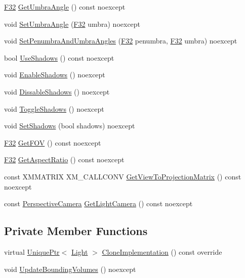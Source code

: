 \begin{DoxyCompactItemize}
\item 
\hyperlink{namespacemage_aa97e833b45f06d60a0a9c4fc22ae02c0}{F32} \hyperlink{classmage_1_1_spot_light_ae29059615f77f1afe414dc826b2d2af8}{Get\+Umbra\+Angle} () const noexcept
\item 
void \hyperlink{classmage_1_1_spot_light_aab2685ef31177d7e40ef964fb9bc0e24}{Set\+Umbra\+Angle} (\hyperlink{namespacemage_aa97e833b45f06d60a0a9c4fc22ae02c0}{F32} umbra) noexcept
\item 
void \hyperlink{classmage_1_1_spot_light_a7510d29df641a651bab5f3d393e18b60}{Set\+Penumbra\+And\+Umbra\+Angles} (\hyperlink{namespacemage_aa97e833b45f06d60a0a9c4fc22ae02c0}{F32} penumbra, \hyperlink{namespacemage_aa97e833b45f06d60a0a9c4fc22ae02c0}{F32} umbra) noexcept
\item 
bool \hyperlink{classmage_1_1_spot_light_af41a8c0d83b45d048a2d1a030c1235f8}{Use\+Shadows} () const noexcept
\item 
void \hyperlink{classmage_1_1_spot_light_a51694c316560929e6ae49c019d3dc763}{Enable\+Shadows} () noexcept
\item 
void \hyperlink{classmage_1_1_spot_light_ae43668c2ae4c041b8abf822e15ab2185}{Dissable\+Shadows} () noexcept
\item 
void \hyperlink{classmage_1_1_spot_light_ae81d5d3c485a85f373d5b7b861919a3c}{Toggle\+Shadows} () noexcept
\item 
void \hyperlink{classmage_1_1_spot_light_a290ce2f0ce8814cac75f05322fc01cd5}{Set\+Shadows} (bool shadows) noexcept
\item 
\hyperlink{namespacemage_aa97e833b45f06d60a0a9c4fc22ae02c0}{F32} \hyperlink{classmage_1_1_spot_light_a6cbc0ac77c28796cc25a7131bfe4a1c1}{Get\+F\+OV} () const noexcept
\item 
\hyperlink{namespacemage_aa97e833b45f06d60a0a9c4fc22ae02c0}{F32} \hyperlink{classmage_1_1_spot_light_a1cde0db1b5170fc602691652e1dc7f4b}{Get\+Aspect\+Ratio} () const noexcept
\item 
const X\+M\+M\+A\+T\+R\+IX X\+M\+\_\+\+C\+A\+L\+L\+C\+O\+NV \hyperlink{classmage_1_1_spot_light_ae436e8fee37639e9218cc7f3822cebbd}{Get\+View\+To\+Projection\+Matrix} () const noexcept
\item 
const \hyperlink{classmage_1_1_perspective_camera}{Perspective\+Camera} \hyperlink{classmage_1_1_spot_light_ad702870b00f285bbedd76caa5eac26f5}{Get\+Light\+Camera} () const noexcept
\end{DoxyCompactItemize}
\subsection*{Private Member Functions}
\begin{DoxyCompactItemize}
\item 
virtual \hyperlink{namespacemage_a3316d7143a973e37adf1110f2e80ca31}{Unique\+Ptr}$<$ \hyperlink{classmage_1_1_light}{Light} $>$ \hyperlink{classmage_1_1_spot_light_a060044ae1de97143878ad26524f03709}{Clone\+Implementation} () const override
\item 
void \hyperlink{classmage_1_1_spot_light_a83035abee0050acdca47b1f95b30a793}{Update\+Bounding\+Volumes} () noexcept
\end{DoxyCompactItemize}
